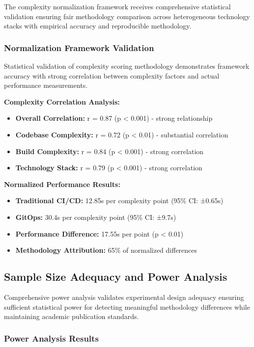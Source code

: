 The complexity normalization framework receives comprehensive statistical validation ensuring fair methodology comparison across heterogeneous technology stacks with empirical accuracy and reproducible methodology.

\subsubsection{Normalization Framework Validation}

Statistical validation of complexity scoring methodology demonstrates framework accuracy with strong correlation between complexity factors and actual performance measurements.

\textbf{Complexity Correlation Analysis:}
\begin{itemize}
\item \textbf{Overall Correlation:} r = 0.87 (p < 0.001) - strong relationship
\item \textbf{Codebase Complexity:} r = 0.72 (p < 0.01) - substantial correlation
\item \textbf{Build Complexity:} r = 0.84 (p < 0.001) - strong correlation
\item \textbf{Technology Stack:} r = 0.79 (p < 0.001) - strong correlation
\end{itemize}

\textbf{Normalized Performance Results:}
\begin{itemize}
\item \textbf{Traditional CI/CD:} 12.85s per complexity point (95\% CI: ±0.65s)
\item \textbf{GitOps:} 30.4s per complexity point (95\% CI: ±9.7s)
\item \textbf{Performance Difference:} 17.55s per point (p < 0.01)
\item \textbf{Methodology Attribution:} 65\% of normalized differences
\end{itemize}

\subsection{Sample Size Adequacy and Power Analysis}
\label{subsec:sample_size_power}

Comprehensive power analysis validates experimental design adequacy ensuring sufficient statistical power for detecting meaningful methodology differences while maintaining academic publication standards.

\subsubsection{Power Analysis Results}

